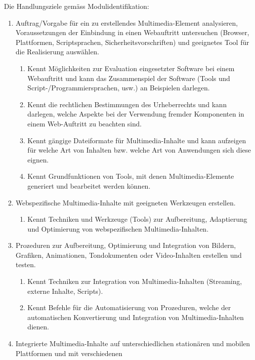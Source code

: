 Die Handlungsziele gemäss Modulidentifikation:

\begin{enumerate}
    \item Auftrag/Vorgabe für ein zu erstellendes Multimedia-Element analysieren, Voraussetzungen der Einbindung in
    einen Webauftritt untersuchen (Browser, Plattformen, Scriptsprachen, Sicherheitsvorschriften) und geeignetes Tool für die Realisierung auswählen.
    \begin{enumerate}
        \item Kennt Möglichkeiten zur Evaluation eingesetzter Software bei einem Webauftritt und kann das Zusammenspiel
        der Software (Tools und Script-/Programmiersprachen, usw.) an Beispielen darlegen.
        \item Kennt die rechtlichen Bestimmungen des Urheberrechts und kann darlegen, welche Aspekte bei der Verwendung
        fremder Komponenten in einem Web-Auftritt zu beachten sind.
        \item Kennt gängige Dateiformate für Multimedia-Inhalte und kann aufzeigen für welche Art von Inhalten bzw.
        welche Art von Anwendungen sich diese eignen.
        \item Kennt Grundfunktionen von Tools, mit denen Multimedia-Elemente generiert und bearbeitet werden können.
    \end{enumerate}
    \item Webspezifische Multimedia-Inhalte mit geeigneten Werkzeugen erstellen.
    \begin{enumerate}
        \item Kennt Techniken und Werkzeuge (Tools) zur Aufbereitung, Adaptierung und Optimierung von webspezifischen Multimedia-Inhalten.
    \end{enumerate}
    \item Prozeduren zur Aufbereitung, Optimierung und Integration von Bildern, Grafiken, Animationen, Tondokumenten
    oder Video-Inhalten erstellen und testen.
    \begin{enumerate}
        \item Kennt Techniken zur Integration von Multimedia-Inhalten (Streaming, externe Inhalte, Scripts).
        \item Kennt Befehle für die Automatisierung von Prozeduren, welche der automatischen Konvertierung und
        Integration von Multimedia-Inhalten dienen.
    \end{enumerate}
    \item  	Integrierte Multimedia-Inhalte auf unterschiedlichen stationären und mobilen Plattformen und mit verschiedenen

\end{enumerate}
